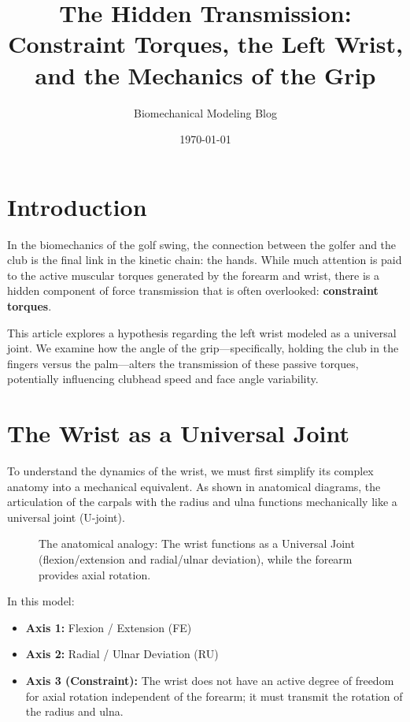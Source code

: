 \documentclass{article}
\title{The Hidden Transmission: Constraint Torques, the Left Wrist, and the Mechanics of the Grip}
\author{Biomechanical Modeling Blog}
\date{\today}
\begin{document}
\maketitle

\section{Introduction}
In the biomechanics of the golf swing, the connection between the golfer and the club is the final link in the kinetic chain: the hands. While much attention is paid to the active muscular torques generated by the forearm and wrist, there is a hidden component of force transmission that is often overlooked: \textbf{constraint torques}.

This article explores a hypothesis regarding the left wrist modeled as a universal joint. We examine how the angle of the grip—specifically, holding the club in the fingers versus the palm—alters the transmission of these passive torques, potentially influencing clubhead speed and face angle variability.

\section{The Wrist as a Universal Joint}

To understand the dynamics of the wrist, we must first simplify its complex anatomy into a mechanical equivalent. As shown in anatomical diagrams, the articulation of the carpals with the radius and ulna functions mechanically like a universal joint (U-joint).

\begin{figure}[h]
    \centering
    \caption{The anatomical analogy: The wrist functions as a Universal Joint (flexion/extension and radial/ulnar deviation), while the forearm provides axial rotation.}
    \label{fig:wrist_ujoint}
\end{figure}

In this model:
\begin{itemize}
    \item \textbf{Axis 1:} Flexion / Extension (FE)
    \item \textbf{Axis 2:} Radial / Ulnar Deviation (RU)
    \item \textbf{Axis 3 (Constraint):} The wrist does not have an active degree of freedom for axial rotation independent of the forearm; it must transmit the rotation of the radius and ulna.
\end{itemize}
\end{document}
